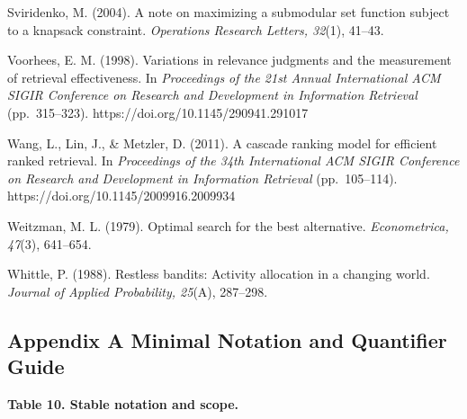 \documentclass[
  11pt]{article}
\begin{document}
Sviridenko, M. (2004). A note on maximizing a submodular set function
subject to a knapsack constraint. \emph{Operations Research Letters,
32}(1), 41--43.

Voorhees, E. M. (1998). Variations in relevance judgments and the
measurement of retrieval effectiveness. In \emph{Proceedings of the 21st
Annual International ACM SIGIR Conference on Research and Development in
Information Retrieval} (pp.~315--323).
https://doi.org/10.1145/290941.291017

Wang, L., Lin, J., \& Metzler, D. (2011). A cascade ranking model for
efficient ranked retrieval. In \emph{Proceedings of the 34th
International ACM SIGIR Conference on Research and Development in
Information Retrieval} (pp.~105--114).
https://doi.org/10.1145/2009916.2009934

Weitzman, M. L. (1979). Optimal search for the best alternative.
\emph{Econometrica, 47}(3), 641--654.

Whittle, P. (1988). Restless bandits: Activity allocation in a changing
world. \emph{Journal of Applied Probability, 25}(A), 287--298.

\subsection{Appendix A Minimal Notation and Quantifier
Guide}\label{appendix-a-minimal-notation-and-quantifier-guide}

\textbf{Table 10. Stable notation and scope.}
\end{document}
